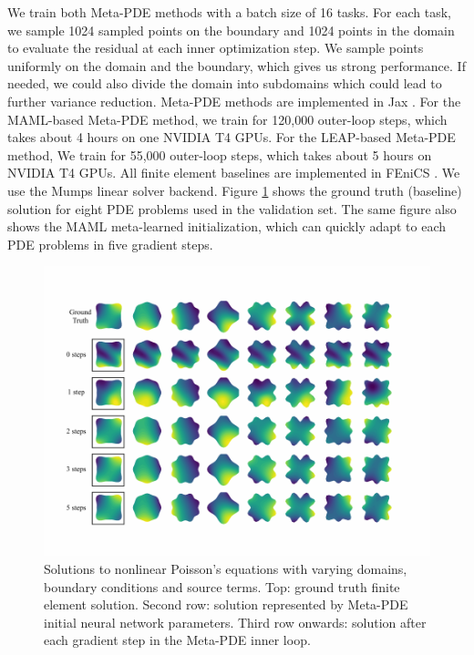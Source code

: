 We train both Meta-PDE methods with a batch size of 16 tasks. For each task, we sample 1024 sampled points on the boundary and 1024 points in the domain to evaluate the residual at each inner optimization step. 
We sample points uniformly on the domain and the boundary, which gives us strong performance. If needed, we could also divide the domain into subdomains which could lead to further variance reduction.
Meta-PDE methods are implemented in Jax \citep{jax2018github}. For the MAML-based Meta-PDE method, we train for 120,000 outer-loop steps, which takes about 4 hours on one NVIDIA T4 GPUs. For the LEAP-based Meta-PDE method, We train for 55,000 outer-loop steps, which takes about 5 hours on NVIDIA T4 GPUs. All finite element baselines are implemented in FEniCS \citep{LoggMardalEtAl2012a,AlnaesBlechta2015a}. We use the Mumps linear solver backend. Figure \ref{fig:results_per_step} shows the ground truth (baseline) solution for eight PDE problems used in the validation set. The same figure also shows the MAML meta-learned initialization, which can quickly adapt to each PDE problems in five gradient steps. 
\begin{figure}
 \includegraphics[width=1.4\linewidth]{figures/poisson_meta.pdf}
\caption{Solutions to nonlinear Poisson's equations with varying domains, boundary conditions and source terms. Top: ground truth finite element solution. Second row: solution represented by Meta-PDE initial neural network parameters. Third row onwards: solution after each gradient step in the Meta-PDE inner loop.}
\label{fig:results_per_step}
\end{figure}

